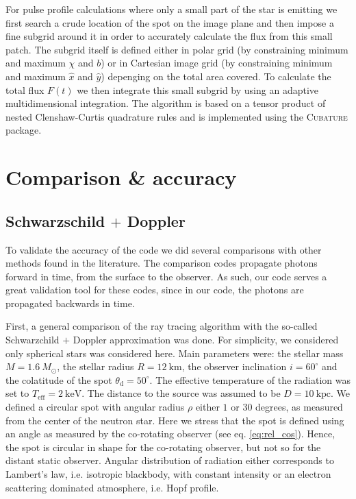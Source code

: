 \documentclass[iop, usenatbib]{emulateapj}
\newcommand{\Msun}{\ensuremath{M_{\odot}}}
\begin{document}
For pulse profile calculations where only a small part of the star is
emitting we first search a crude location of the spot on the image plane
and then impose a fine subgrid around it in order to accurately
calculate the flux from this small patch.  The subgrid itself is defined
either in polar grid (by constraining minimum and maximum $\chi$ and
$b$) or in Cartesian image grid (by constraining minimum and maximum
$\hat{x}$ and $\hat{y}$) depenging on the total area covered.  To
calculate the total flux $F(t)$ we then integrate this small subgrid by
using an adaptive multidimensional integration.  The algorithm is based
on a tensor product of nested Clenshaw-Curtis quadrature rules and is
implemented using the \textsc{Cubature} package.



\section{Comparison \& accuracy}

\subsection{Schwarzschild $+$ Doppler}

To validate the accuracy of the code we did several comparisons with
other methods found in the literature.
The comparison codes propagate photons forward in time, from the surface to the
observer. As such, our code serves a great validation tool for these
codes, since in our code, the photons are propagated backwards in
time.

First, a general comparison
of the ray tracing algorithm with the so-called
Schwarzchild $+$ Doppler approximation \citep[see e.g.][]{PB06} was done.  
For simplicity, we considered only spherical stars was considered here.
Main parameters were: the stellar mass $M = 1.6~\Msun$, the stellar radius $R =
12~\mathrm{km}$, the observer inclination $i = 60^{\circ}$ and the colatitude
of the spot $\theta_{\mathrm{d}} = 50^{\circ}$.  The effective
temperature of the radiation was set to $T_{\mathrm{eff}} =
2~\mathrm{keV}$.  The distance to the source was assumed to be $D =
10~\mathrm{kpc}$.  We defined a circular spot with angular radius $\rho$
either $1$ or $30$ degrees, as measured from the center of the neutron
star.  Here we stress that the spot is defined
using an angle as measured by the co-rotating observer (see eq.
\eqref{eq:rel_cos}).  Hence, the spot is circular in
shape for the co-rotating observer, but not so for the distant static observer.
Angular distribution of radiation either corresponds to Lambert's law,
i.e. isotropic blackbody, with constant intensity or an electron scattering
dominated atmosphere, i.e. Hopf profile.
\end{document}
